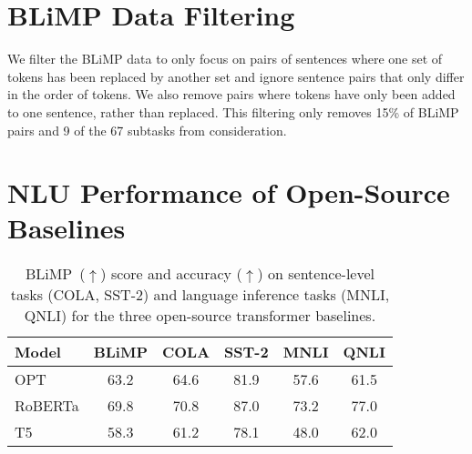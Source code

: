 \section{BLiMP Data Filtering}
\label{section:appendix-data-filtering}

We filter the BLiMP data to only focus on pairs of sentences where one set of tokens has been replaced by another set and ignore sentence pairs that only differ in the order of tokens. We also remove pairs where tokens have only been added to one sentence, rather than replaced. This filtering only removes 15\% of BLiMP pairs and 9 of the 67 subtasks from consideration. 

\section{NLU Performance of Open-Source Baselines}
\label{section:opensource-baselines-nlu-results}

\begin{table}[ht!]
\centering
\small
\setlength{\tabcolsep}{5pt} %
\begin{tabular}{l|c|cccc}
\toprule
\textbf{Model} & \textbf{BLiMP} & \textbf{COLA} & \textbf{SST-2} & \textbf{MNLI} & \textbf{QNLI} \\
\midrule
OPT & 63.2 & 64.6 & 81.9 & 57.6 & 61.5 \\
RoBERTa & 69.8 & 70.8 & 87.0 & 73.2 & 77.0 \\
T5 & 58.3 & 61.2 & 78.1 & 48.0 & 62.0 \\
\bottomrule
\end{tabular}
\caption{\label{tbl:opensource-baselines-nlu-results} BLiMP~($\uparrow$) score and accuracy ($\uparrow$) on sentence-level tasks (COLA, SST-2) and language inference tasks (MNLI, QNLI) for the three open-source transformer baselines.}
\end{table}